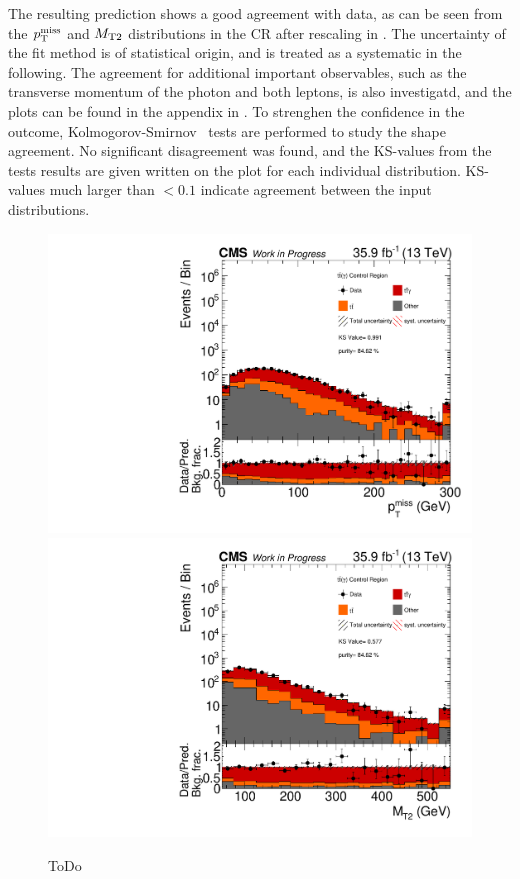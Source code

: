 The resulting prediction shows a good agreement with data, as can be seen from the $p_{\mathrm{T}}^\text{miss}$ and $M_{\mathrm{T2}}$ distributions in the CR after rescaling in . The uncertainty of the fit method is of statistical origin, and is treated as a systematic in the following. The agreement for additional important observables, such as the transverse momentum of the photon and both leptons, is also investigatd, and the plots can be found in the appendix in . To strenghen the confidence in the outcome, Kolmogorov-Smirnov~\cite{KS} tests are performed to study the shape agreement. No significant disagreement was found, and the KS-values from the tests results are given written on the plot for each individual distribution. KS-values much larger than $<0.1$ indicate agreement between the input distributions.\\
\begin{figure}[htb]
 \centering
 \includegraphics[width=\pairwidth]{figures/plots_CR_tt/CRTT_EM_nom_met_log}
 \includegraphics[width=\pairwidth]{figures/plots_CR_tt/CRTT_EM_nom_mt2_log}
 \caption{ToDo}
 \label{fig:TTCR}
\end{figure}
